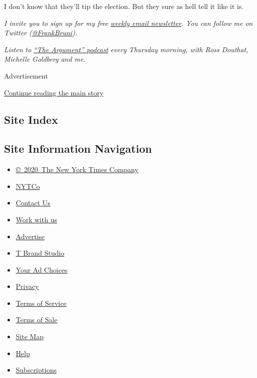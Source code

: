 I don't know that they'll tip the election. But they sure as hell tell
it like it is.

\emph{I invite you to sign up for my free}
\href{https://www.nytimes.com/newsletters/frank-bruni}{\emph{weekly
email newsletter}}\emph{. You can follow me on Twitter
(}\href{https://twitter.com/FrankBruni}{\emph{@FrankBruni}}\emph{).}

\emph{Listen to}
\href{https://www.nytimes.com/column/the-argument}{\emph{``The
Argument'' podcast}} \emph{every Thursday morning, with Ross Douthat,
Michelle Goldberg and me.}

Advertisement

\protect\hyperlink{after-bottom}{Continue reading the main story}

\hypertarget{site-index}{%
\subsection{Site Index}\label{site-index}}

\hypertarget{site-information-navigation}{%
\subsection{Site Information
Navigation}\label{site-information-navigation}}

\begin{itemize}
\tightlist
\item
  \href{https://help.nytimes.com/hc/en-us/articles/115014792127-Copyright-notice}{©~2020~The
  New York Times Company}
\end{itemize}

\begin{itemize}
\tightlist
\item
  \href{https://www.nytco.com/}{NYTCo}
\item
  \href{https://help.nytimes.com/hc/en-us/articles/115015385887-Contact-Us}{Contact
  Us}
\item
  \href{https://www.nytco.com/careers/}{Work with us}
\item
  \href{https://nytmediakit.com/}{Advertise}
\item
  \href{http://www.tbrandstudio.com/}{T Brand Studio}
\item
  \href{https://www.nytimes.com/privacy/cookie-policy\#how-do-i-manage-trackers}{Your
  Ad Choices}
\item
  \href{https://www.nytimes.com/privacy}{Privacy}
\item
  \href{https://help.nytimes.com/hc/en-us/articles/115014893428-Terms-of-service}{Terms
  of Service}
\item
  \href{https://help.nytimes.com/hc/en-us/articles/115014893968-Terms-of-sale}{Terms
  of Sale}
\item
  \href{https://spiderbites.nytimes.com}{Site Map}
\item
  \href{https://help.nytimes.com/hc/en-us}{Help}
\item
  \href{https://www.nytimes.com/subscription?campaignId=37WXW}{Subscriptions}
\end{itemize}
